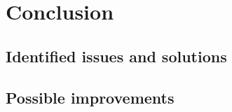 \section{Conclusion}
\label{sec:conclusion}

\subsection{Identified issues and solutions} 

\subsection{Possible improvements}